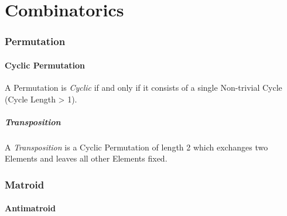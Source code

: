 \part{Combinatorics}\label{sec:combinatorics}

\section{Permutation}\label{sec:permutation}

\subsection{Cyclic Permutation}\label{sec:cyclic_permutation}

A Permutation is \emph{Cyclic} if and only if it consists of a single
Non-trivial Cycle (Cycle Length > 1).



\subsubsection{Transposition}\label{sec:transposition}

A \emph{Transposition} is a Cyclic Permutation of length 2 which
exchanges two Elements and leaves all other Elements fixed.



\section{Matroid}\label{sec:matroid}

\subsection{Antimatroid}\label{sec:antimatroid}

